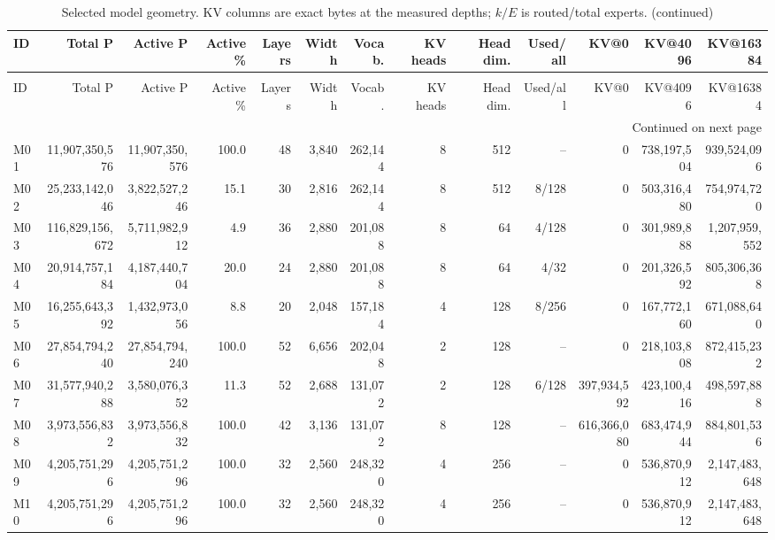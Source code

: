 \documentclass[10pt]{article}
\begin{document}
\begin{landscape}
\begingroup
\small
\setlength{\tabcolsep}{3.5pt}
\renewcommand{\arraystretch}{1.08}
\begin{longtable}{@{}l r r r r r r r r r r r r@{}}
\caption{Selected model geometry. KV columns are exact bytes at the measured depths; $k/E$ is routed/total experts.}\label{tab:model-geometry}\\
\toprule
ID & Total P & Active P & Active \% & Layers & Width & Vocab. & KV heads & Head dim. & Used/all & KV@0 & KV@4096 & KV@16384 \\
\midrule
\endfirsthead
\caption[]{Selected model geometry. KV columns are exact bytes at the measured depths; $k/E$ is routed/total experts. (continued)}\\
\toprule
ID & Total P & Active P & Active \% & Layers & Width & Vocab. & KV heads & Head dim. & Used/all & KV@0 & KV@4096 & KV@16384 \\
\midrule
\endhead
\midrule
\multicolumn{13}{r}{Continued on next page}\\
\endfoot
\bottomrule
\endlastfoot
M01 & 11,907,350,576 & 11,907,350,576 & 100.0 & 48 & 3,840 & 262,144 & 8 & 512 & -- & 0 & 738,197,504 & 939,524,096 \\
M02 & 25,233,142,046 & 3,822,527,246 & 15.1 & 30 & 2,816 & 262,144 & 8 & 512 & 8/128 & 0 & 503,316,480 & 754,974,720 \\
M03 & 116,829,156,672 & 5,711,982,912 & 4.9 & 36 & 2,880 & 201,088 & 8 & 64 & 4/128 & 0 & 301,989,888 & 1,207,959,552 \\
M04 & 20,914,757,184 & 4,187,440,704 & 20.0 & 24 & 2,880 & 201,088 & 8 & 64 & 4/32 & 0 & 201,326,592 & 805,306,368 \\
M05 & 16,255,643,392 & 1,432,973,056 & 8.8 & 20 & 2,048 & 157,184 & 4 & 128 & 8/256 & 0 & 167,772,160 & 671,088,640 \\
M06 & 27,854,794,240 & 27,854,794,240 & 100.0 & 52 & 6,656 & 202,048 & 2 & 128 & -- & 0 & 218,103,808 & 872,415,232 \\
M07 & 31,577,940,288 & 3,580,076,352 & 11.3 & 52 & 2,688 & 131,072 & 2 & 128 & 6/128 & 397,934,592 & 423,100,416 & 498,597,888 \\
M08 & 3,973,556,832 & 3,973,556,832 & 100.0 & 42 & 3,136 & 131,072 & 8 & 128 & -- & 616,366,080 & 683,474,944 & 884,801,536 \\
M09 & 4,205,751,296 & 4,205,751,296 & 100.0 & 32 & 2,560 & 248,320 & 4 & 256 & -- & 0 & 536,870,912 & 2,147,483,648 \\
M10 & 4,205,751,296 & 4,205,751,296 & 100.0 & 32 & 2,560 & 248,320 & 4 & 256 & -- & 0 & 536,870,912 & 2,147,483,648 \\

\end{longtable}
\end{landscape}
\end{document}
